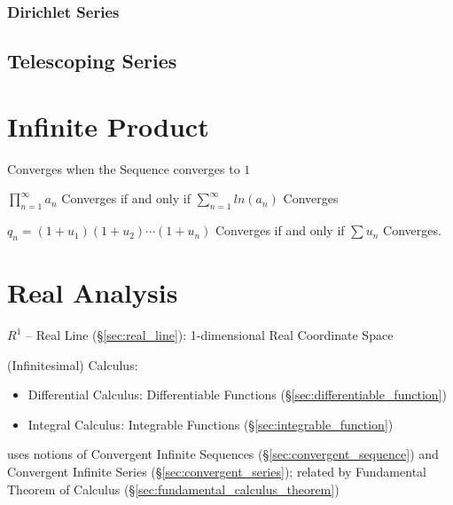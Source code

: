 


\subsubsection{Dirichlet Series}\label{sec:dirichlet_series}



\subsection{Telescoping Series}\label{sec:telescoping_series}



\section{Infinite Product}\label{sec:infinite_product}

Converges when the Sequence converges to $1$

$\prod_{n=1}^\infty a_n$ Converges if and only if $\sum_{n=1}^\infty
ln(a_n)$ Converges

$q_n = (1 + u_1)(1 + u_2)\cdots(1 + u_n)$ Converges if and only if
$\sum u_n$ Converges.



\section{Real Analysis}\label{sec:real_analysis}

$R^1$ -- Real Line (\S\ref{sec:real_line}): 1-dimensional Real
Coordinate Space

(Infinitesimal) Calculus:
\begin{itemize}
\item Differential Calculus: Differentiable Functions
  (\S\ref{sec:differentiable_function})
\item Integral Calculus: Integrable Functions (\S\ref{sec:integrable_function})
\end{itemize}
uses notions of Convergent Infinite Sequences (\S\ref{sec:convergent_sequence})
and Convergent Infinite Series (\S\ref{sec:convergent_series}); related by
Fundamental Theorem of Calculus (\S\ref{sec:fundamental_calculus_theorem})

